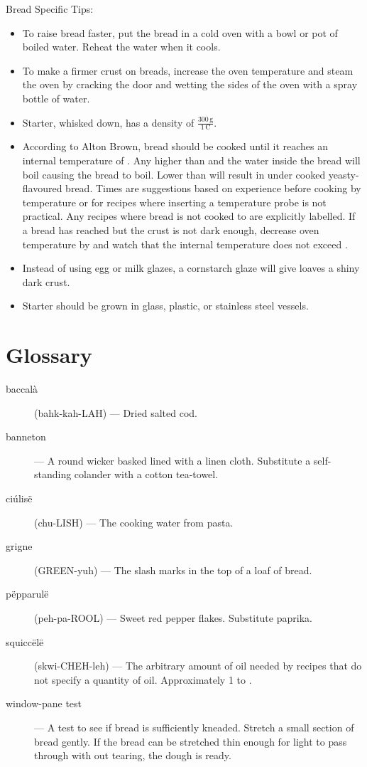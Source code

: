 \documentclass{book}
\begin{document}
\noindent Bread Specific Tips:
\begin{itemize}
\item To raise bread faster, put the bread in a cold oven with a bowl or pot of boiled water. Reheat the water when it cools.
\item To make a firmer crust on breads, increase the oven temperature and steam the oven by cracking the door and wetting the sides of the oven with a spray bottle of water.
\item Starter, whisked down, has a density of $\frac{300\,\mathrm{g}}{1\,\mathrm{C}}$.
\item According to Alton Brown, bread should be cooked until it reaches an internal temperature of . Any higher than  and the water inside the bread will boil causing the bread to boil. Lower than  will result in under cooked yeasty-flavoured bread. Times are suggestions based on experience before cooking by temperature or for recipes where inserting a temperature probe is not practical. Any recipes where bread is not cooked to  are explicitly labelled. If a bread has reached  but the crust is not dark enough, decrease oven temperature by  and watch that the internal temperature does not exceed .
\item Instead of using egg or milk glazes, a cornstarch glaze will give loaves a shiny dark crust.
\item Starter should be grown in glass, plastic, or stainless steel vessels.
\end{itemize}

\def\ThisFile{rcp:ToastingNuts}

\mainmatter



\backmatter

\chapter{Glossary}
\begin{description}
\item[baccal\`a] (bahk-kah-LAH) --- Dried salted cod.
\item[banneton] --- A round wicker basked lined with a linen cloth. Substitute a self-standing colander with a cotton tea-towel.
\item[ci\'ulis\"e] (chu-LISH) --- The cooking water from pasta.
\item[grigne] (GREEN-yuh) --- The slash marks in the top of a loaf of bread.
\item[p\"epparul\"e] (peh-pa-ROOL) --- Sweet red pepper flakes. Substitute paprika.
\item[squicc\"el\"e] (skwi-CHEH-leh) --- The arbitrary amount of oil needed by recipes that do not specify a quantity of oil. Approximately 1 to .
\item[window-pane test] --- A test to see if bread is sufficiently kneaded. Stretch a small section of bread gently. If the bread can be stretched thin enough for light to pass through with out tearing, the dough is ready.
\end{description}

\printindex
\end{document}
